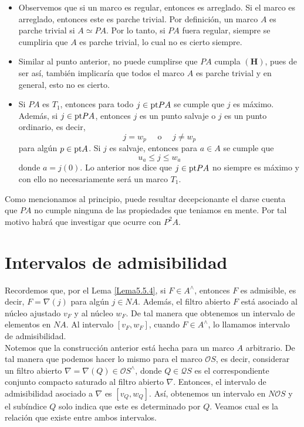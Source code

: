 \begin{itemize}
\item Observemos que si un marco es regular, entonces es arreglado. Si el marco es arreglado, entonces este es parche trivial. Por definición, un marco $A$ es parche trivial si $A\simeq PA$. Por lo tanto, si $PA$ fuera regular, siempre se cumpliria que $A$ es parche trivial, lo cual no es cierto siempre.
\item Similar al punto anterior, no puede cumplirse que $PA$ cumpla $\mathbf{(H)}$, pues de ser así, también implicaría que todos el marco $A$ es parche trivial y en general, esto no es cierto.
\item Si $PA$ es $T_1$, entonces para todo $j\in \mathrm{pt} PA$ se cumple que $j$ es máximo. Además, si $j\in \mathrm{pt} PA$, entonces $j$ es un punto salvaje o $j$ es un punto ordinario, es decir,
\[
j=w_p\quad \mbox{ o }\quad j\neq w_p
\]
para algún $p\in \mathrm{pt} A$. Si $j$ es salvaje, entonces para $a\in A$ se cumple que 
\[
u_a\leq j\leq w_a
\]
donde $a=j(0)$. Lo anterior nos dice que $j\in \mathrm{pt} PA$ no siempre es máximo y con ello no necesariamente será un marco $T_1$.
\end{itemize}

Como mencionamos al principio, puede resultar decepcionante el darse cuenta que $PA$ no cumple ninguna de las propiedades que teniamos en mente. Por tal motivo habrá que investigar que ocurre con $P^2A$.

\section{Intervalos de admisibilidad}

Recordemos que, por el Lema \ref{Lema5.5.4}, si $F\in A^\wedge$, entonces $F$ es admisible, es decir, $F=\nabla(j)$ para algún $j\in NA$. Además, el filtro abierto $F$ está asociado al núcleo ajustado $v_F$ y al núcleo $w_F$. De tal manera que obtenemos un intervalo de elementos en $NA$. Al intervalo $[v_F, w_F]$, cuando $F\in A^\wedge$, lo llamamos intervalo de admisibilidad.\\

Notemos que la construcción anterior está hecha para un marco $A$ arbitrario. De tal manera que podemos hacer lo mismo para el marco $\mathcal{O}S$, es decir, considerar un filtro abierto $\nabla=\nabla(Q)\in \mathcal{O}S^\wedge$, donde $Q\in \mathcal{Q}S$ es el correspondiente conjunto compacto saturado al filtro abierto $\nabla$. Entonces, el intervalo de admisibilidad asociado a $\nabla$ es $[v_Q, w_Q]$. 
Así, obtenemos un intervalo en $N\mathcal{O}S$ y el subíndice $Q$ solo indica que este es determinado por $Q$. Veamos cual es la relación que existe entre ambos intervalos.

